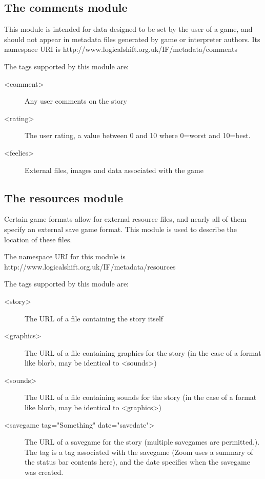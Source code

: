 \documentclass[a4paper,11pt]{article}
\begin{document}
\subsection{The comments module}

This module is intended for data designed to be set by the user of a game, and should not appear in metadata files generated by
game or interpreter authors. Its namespace URI is http://www.logicalshift.org.uk/IF/metadata/comments

The tags supported by this module are:

\begin{description}
\item[<comment>] Any user comments on the story
\item[<rating>] The user rating, a value between 0 and 10 where 0=worst and 10=best.
\item[<feelies>] External files, images and data associated with the game
\end{description}

\subsection{The resources module}

Certain game formats allow for external resource files, and nearly all of them specify
an external save game format. This module is used to describe the location of these files.

The namespace URI for this module is http://www.logicalshift.org.uk/IF/metadata/resources

The tags supported by this module are:

\begin{description}
\item[<story>] The URL of a file containing the story itself
\item[<graphics>] The URL of a file containing graphics for the story (in the case of a format like blorb, may be identical to <sounds>)
\item[<sounds>] The URL of a file containing sounds for the story (in the case of a format like blorb, may be identical to <graphics>)
\item[<savegame tag="Something" date="savedate">] The URL of a savegame for the story 
(multiple savegames are permitted.). The tag is a tag associated with the savegame
(Zoom uses a summary of the status bar contents here), and the date specifies when the
savegame was created.
\end{description}
\end{document}
